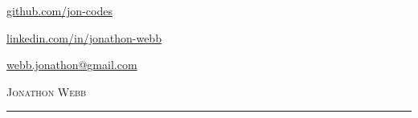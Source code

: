 \documentclass[a4paper, 10pt]{article}
\begin{document}
\begin{flushright}
  \item \href{https://github.com/jon-codes}{github.com/jon-codes}
  \item \href{https://linkedin.com/in/jonathon-webb}{linkedin.com/in/jonathon-webb}
  \item \href{mailto:webb.jonathon@gmail.com}{webb.jonathon@gmail.com}
\end{flushright}\vspace{-45pt}

\begin{flushleft}
  {\Calluna \fontsize{30pt}{30pt}\selectfont \textsc{Jonathon Webb}} \quad {\Calluna \fontsize{14.5pt}{14.5pt}\selectfont \textsc{}}
  \noindent\rule{\textwidth}{0.4pt}
\end{flushleft}
\end{document}
